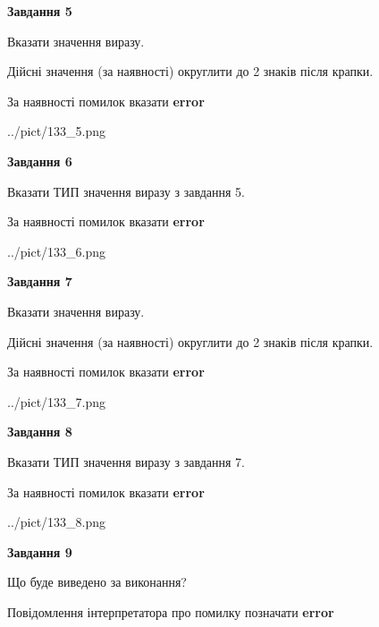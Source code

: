 \documentclass[11pt, ukrainian]{article}
\begin{document}
{\begin {large}
{\begin {center}\textbf{Завдання 5}\end {center}}\par
Вказати значення виразу. \par
Дійсні значення (за наявності) округлити до 2 знаків після крапки. \par
За наявності помилок вказати \textbf{error}

\begin{center}
	{../pict/133_5.png}
\end{center}
\newpage

{\begin {center}\textbf{Завдання 6}\end {center}}\par
Вказати ТИП значення виразу з завдання 5. \par
За наявності помилок вказати \textbf{error}

\begin{center}
	{../pict/133_6.png}
\end{center}
\newpage

{\begin {center}\textbf{Завдання 7}\end {center}}\par
Вказати значення виразу. \par
Дійсні значення (за наявності) округлити до 2 знаків після крапки. \par
За наявності помилок вказати \textbf{error}

\begin{center}
	{../pict/133_7.png}
\end{center}
\newpage

{\begin {center}\textbf{Завдання 8}\end {center}}\par
Вказати ТИП значення виразу з завдання 7. \par
За наявності помилок вказати \textbf{error}

\begin{center}
	{../pict/133_8.png}
\end{center}
\newpage

{\begin {center}\textbf{Завдання 9}\end {center}}\par
Що буде виведено за виконання? \par
Повідомлення інтерпретатора про помилку позначати \textbf{error}


\end{large}}
\end{document}
